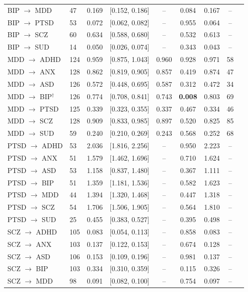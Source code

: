 \documentclass[11pt]{article}
\begin{document}
\begin{table}[h]
\begin{tabular}{llccccccc}
BIP $\to$ MDD & 47 & 0.169 & [0.152, 0.186] & -- & 0.084 & 0.167 & -- \\
BIP $\to$ PTSD & 53 & 0.072 & [0.062, 0.082] & -- & 0.955 & 0.064 & -- \\
BIP $\to$ SCZ & 60 & 0.634 & [0.588, 0.680] & -- & 0.532 & 0.613 & -- \\
BIP $\to$ SUD & 14 & 0.050 & [0.026, 0.074] & -- & 0.343 & 0.043 & -- \\
\midrule
MDD $\to$ ADHD & 124 & 0.959 & [0.875, 1.043] & 0.960 & 0.928 & 0.971 & 58 \\
MDD $\to$ ANX & 128 & 0.862 & [0.819, 0.905] & 0.857 & 0.419 & 0.874 & 47 \\
MDD $\to$ ASD & 126 & 0.572 & [0.448, 0.695] & 0.587 & 0.312 & 0.472 & 34 \\
MDD $\to$ BIP$^{\dagger}$ & 126 & 0.774 & [0.708, 0.841] & 0.743 & \textbf{0.008} & 0.803 & 69 \\
MDD $\to$ PTSD & 125 & 0.339 & [0.323, 0.355] & 0.337 & 0.467 & 0.334 & 46 \\
MDD $\to$ SCZ & 128 & 0.909 & [0.833, 0.985] & 0.897 & 0.520 & 0.825 & 85 \\
MDD $\to$ SUD & 59 & 0.240 & [0.210, 0.269] & 0.243 & 0.568 & 0.252 & 68 \\
\midrule
PTSD $\to$ ADHD & 53 & 2.036 & [1.816, 2.256] & -- & 0.950 & 2.223 & -- \\
PTSD $\to$ ANX & 51 & 1.579 & [1.462, 1.696] & -- & 0.710 & 1.624 & -- \\
PTSD $\to$ ASD & 53 & 1.158 & [0.837, 1.480] & -- & 0.367 & 1.111 & -- \\
PTSD $\to$ BIP & 51 & 1.359 & [1.181, 1.536] & -- & 0.582 & 1.623 & -- \\
PTSD $\to$ MDD & 44 & 1.394 & [1.320, 1.468] & -- & 0.447 & 1.318 & -- \\
PTSD $\to$ SCZ & 54 & 1.706 & [1.506, 1.905] & -- & 0.564 & 1.810 & -- \\
PTSD $\to$ SUD & 25 & 0.455 & [0.383, 0.527] & -- & 0.395 & 0.498 & -- \\
\midrule
SCZ $\to$ ADHD & 105 & 0.083 & [0.054, 0.113] & -- & 0.858 & 0.083 & -- \\
SCZ $\to$ ANX & 103 & 0.137 & [0.122, 0.153] & -- & 0.674 & 0.128 & -- \\
SCZ $\to$ ASD & 106 & 0.153 & [0.109, 0.196] & -- & 0.981 & 0.137 & -- \\
SCZ $\to$ BIP & 103 & 0.334 & [0.310, 0.359] & -- & 0.115 & 0.326 & -- \\
SCZ $\to$ MDD & 98 & 0.091 & [0.082, 0.100] & -- & 0.754 & 0.097 & -- \\

\end{tabular}
\end{table}
\end{document}
